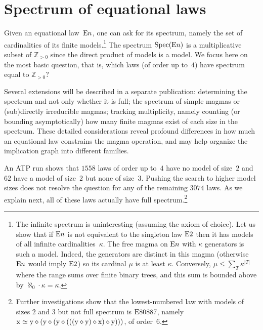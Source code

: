 \section{Spectrum of equational laws}\label{spectrum-sec}

Given an equational law~$\mathrm{E}n$, one can ask for its spectrum, namely the set of cardinalities of its finite models.\footnote{The infinite spectrum is uninteresting (assuming the axiom of choice).  Let us show that if $\mathrm{E}n$ is not equivalent to the singleton law $\mathrm{E}2$ then it has models of all infinite cardinalities~$\kappa$.  The free magma on $\mathrm{E}n$ with $\kappa$ generators is such a model.  Indeed, the generators are distinct in this magma (otherwise $\mathrm{E}n$ would imply $\mathrm{E}2$) so its cardinal $\mu$ is at least $\kappa$.  Conversely, $\mu\leq\sum_T\kappa^{|T|}$ where the range sums over finite binary trees, and this sum is bounded above by $\aleph_0\cdot\kappa=\kappa$.}
The spectrum $\operatorname{Spec}(\mathrm{E}n)$ is a multiplicative subset of $\mathbb{Z}_{>0}$ since the direct product of models is a model.
We focus here on the most basic question, that is, which laws (of order up to~$4$) have spectrum equal to $\mathbb{Z}_{>0}$?

Several extensions will be described in a separate publication: determining the spectrum and not only whether it is full; the spectrum of simple magmas or (sub)directly irreducible magmas; tracking multiplicity, namely counting (or bounding asymptotically) how many finite magmas exist of each size in the spectrum.  These detailed considerations reveal profound differences in how much an equational law constrains the magma operation, and may help organize the implication graph into different families.

An ATP run shows that $\num{1558}$ laws of order up to~$4$ have no model of size~$2$ and $\num{62}$ have a model of size~$2$ but none of size~$3$.  Pushing the search to higher model sizes does not resolve the question for any of the remaining $\num{3074}$ laws.  As we explain next, all of these laws actually have full spectrum.\footnote{Further investigations show that the lowest-numbered law with models of sizes $2$ and $3$ but not full spectrum is $\mathrm{E}80887$, namely $\mathrm{x} \simeq \mathrm{y} \diamond (\mathrm{y} \diamond (\mathrm{y} \diamond (((\mathrm{y} \diamond \mathrm{y}) \diamond \mathrm{x}) \diamond \mathrm{y})))$, of order~$6$.}


